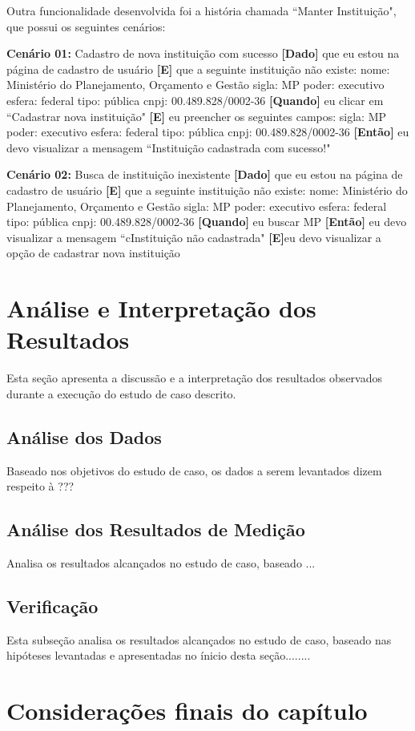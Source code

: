 Outra funcionalidade desenvolvida foi a história chamada ``Manter Instituição", que possui os seguintes cenários:

\textbf{Cenário 01:} Cadastro de nova instituição com sucesso
\textbf{[Dado]} que eu estou na página de cadastro de usuário
\textbf{[E]} que a seguinte instituição não existe:
  	nome: Ministério do Planejamento, Orçamento e Gestão
  	sigla: MP
 	poder: executivo
 	esfera: federal
  	tipo: pública
  	cnpj: 00.489.828/0002-36
\textbf{[Quando]} eu clicar em ``Cadastrar nova instituição" 
\textbf{[E]} eu preencher os seguintes campos:
  	sigla: MP
  	poder: executivo
  	esfera: federal
  	tipo: pública
  	cnpj: 00.489.828/0002-36
\textbf{[Então]} eu devo visualizar a mensagem ``Instituição cadastrada com sucesso!"

\textbf{Cenário 02:} Busca de instituição inexistente
\textbf{[Dado]} que eu estou na página de cadastro de usuário
\textbf{[E]} que a seguinte instituição não existe:
  nome: Ministério do Planejamento, Orçamento e Gestão
  sigla: MP
  poder: executivo
  esfera: federal
  tipo: pública
  cnpj: 00.489.828/0002-36
\textbf{[Quando]} eu buscar MP
\textbf{[Então]} eu devo visualizar a mensagem ``cInstituição não cadastrada" 
\textbf{[E]}eu devo visualizar a opção de cadastrar nova instituição


\section{Análise e Interpretação dos Resultados}

Esta seção apresenta a discussão e a interpretação dos resultados observados durante a execução do estudo de caso descrito.

\subsection{Análise dos Dados}

Baseado nos objetivos do estudo de caso, os dados a serem levantados dizem respeito à ???

\subsection{Análise dos Resultados de Medição}

Analisa os resultados alcançados no estudo de caso, baseado ...

\subsection{Verificação}

Esta subseção analisa os resultados alcançados no estudo de caso, baseado nas hipóteses levantadas e apresentadas no ínicio desta seção........


\section{Considerações finais do capítulo}







